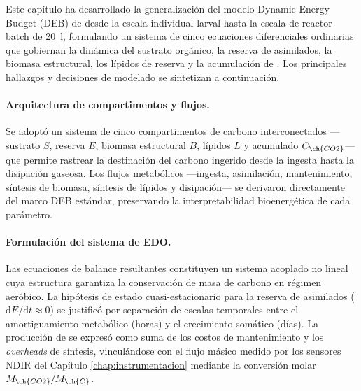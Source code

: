 

Este capítulo ha desarrollado la generalización del modelo Dynamic Energy Budget (DEB) de \parencite{eriksenDynamicModellingFeed2022} desde la escala individual larval hasta la escala de reactor batch de \SI{20}{\litre}, formulando un sistema de cinco ecuaciones diferenciales ordinarias que gobiernan la dinámica del sustrato orgánico, la reserva de asimilados, la biomasa estructural, los lípidos de reserva y la acumulación de . Los principales hallazgos y decisiones de modelado se sintetizan a continuación.

\paragraph{Arquitectura de compartimentos y flujos.} Se adoptó un sistema de cinco compartimentos de carbono interconectados —sustrato $S$, reserva $E$, biomasa estructural $B$, lípidos $L$ y  acumulado $C_{\ch{CO2}}$— que permite rastrear la destinación del carbono ingerido desde la ingesta hasta la disipación gaseosa. Los flujos metabólicos —ingesta, asimilación, mantenimiento, síntesis de biomasa, síntesis de lípidos y disipación— se derivaron directamente del marco DEB estándar, preservando la interpretabilidad bioenergética de cada parámetro.

\paragraph{Formulación del sistema de EDO.} Las ecuaciones de balance resultantes constituyen un sistema acoplado no lineal cuya estructura garantiza la conservación de masa de carbono en régimen aeróbico. La hipótesis de estado cuasi-estacionario para la reserva de asimilados ($\mathrm{d}E/\mathrm{d}t \approx 0$) se justificó por separación de escalas temporales entre el amortiguamiento metabólico (horas) y el crecimiento somático (días). La producción de  se expresó como suma de los costos de mantenimiento y los \emph{overheads} de síntesis, vinculándose con el flujo másico medido por los sensores NDIR del Capítulo \ref{chap:instrumentacion} mediante la conversión molar $M_{\ch{CO2}}/M_{\ch{C}}$.

